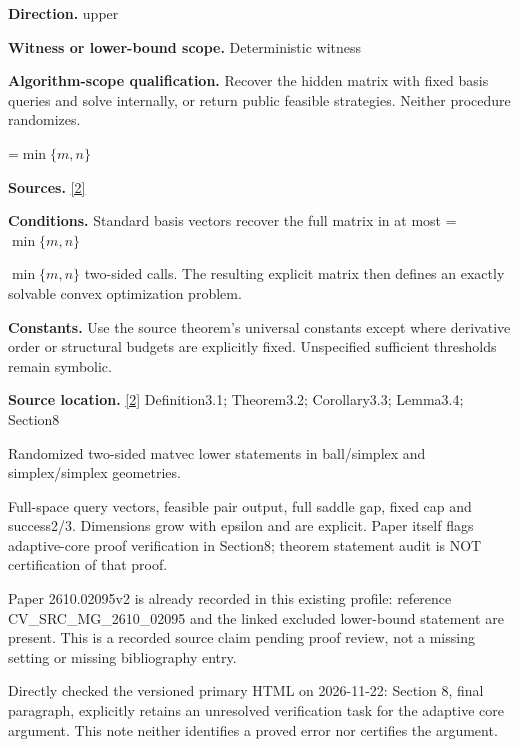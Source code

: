\documentclass[10pt,a4paper]{article}
\newcommand{\AtlasMath}[1]{\par\begingroup\centering\setbox0=\hbox{$\displaystyle #1$}\ifdim\wd0>1.4\linewidth\typeout{ATLAS WIDE FORMULA: \the\wd0}\fi\ifdim\wd0>\linewidth\resizebox{\linewidth}{!}{\box0}\else\box0\fi\par\endgroup}
\newcommand{\AtlasInlineMath}[1]{\begingroup\setbox0=\hbox{$#1$}\ifdim\wd0>.4\linewidth\endgroup\AtlasMath{#1}\else\endgroup$#1$\fi}
\begin{document}
\textbf{Direction.} upper



\textbf{Witness or lower-bound scope.} Deterministic witness



\textbf{Algorithm-scope qualification.} Recover the hidden matrix with fixed basis queries and solve internally, or return public feasible strategies. Neither procedure randomizes.



\AtlasMath{\min\{m,n\}}


\textbf{Sources.} \href{https://arxiv.org/pdf/2610.02095v2}{[2]}



\textbf{Conditions.} Standard basis vectors recover the full matrix in at most \AtlasInlineMath{\min\{m,n\}} two-sided calls. The resulting explicit matrix then defines an exactly solvable convex optimization problem.



\textbf{Constants.} Use the source theorem’s universal constants except where derivative order or structural budgets are explicitly fixed. Unspecified sufficient thresholds remain symbolic.



\textbf{Source location.} \href{https://arxiv.org/pdf/2610.02095v2}{[2]} Definition3.1; Theorem3.2; Corollary3.3; Lemma3.4; Section8



Randomized two-sided matvec lower statements in ball/simplex and simplex/simplex geometries.



Full-space query vectors, feasible pair output, full saddle gap, fixed cap and success2/3. Dimensions grow with epsilon and are explicit. Paper itself flags adaptive-core proof verification in Section8; theorem statement audit is NOT certification of that proof.



Paper 2610.02095v2 is already recorded in this existing profile: reference CV\_SRC\_MG\_2610\_02095 and the linked excluded lower-bound statement are present. This is a recorded source claim pending proof review, not a missing setting or missing bibliography entry.



Directly checked the versioned primary HTML on 2026-11-22: Section 8, final paragraph, explicitly retains an unresolved verification task for the adaptive core argument. This note neither identifies a proved error nor certifies the argument.
\end{document}
